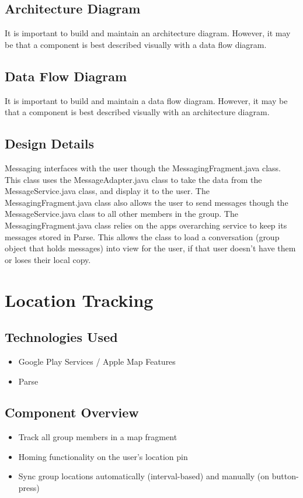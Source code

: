 \subsection{Architecture Diagram}
It is important to build and maintain an architecture diagram.  However, it may 
be that a component is best described visually with a data flow diagram. 

\subsection{Data Flow Diagram}
It is important to build and maintain a data flow diagram.  However, it may be 
that a component is best described visually with an architecture diagram. 

\subsection{Design Details}
Messaging interfaces with the user though the MessagingFragment.java class. This class uses the MessageAdapter.java class to take the data from the MessageService.java class, and display it to the user. The MessagingFragment.java class also allows the user to send messages though the MessageService.java class to all other members in the group.
The MessagingFragment.java class relies on the apps overarching service to keep its messages stored in Parse. This allows the class to load a conversation (group object that holds messages) into view for the user, if that user doesn't have them or loses their local copy.

\section{Location Tracking }

\subsection{Technologies  Used}
\begin{itemize}
  \item Google Play Services / Apple Map Features
  \item Parse
\end{itemize}

\subsection{Component  Overview}
\begin{itemize}
  \item Track all group members in a map fragment
  \item Homing functionality on the user's location pin
  \item Sync group locations automatically (interval-based) and manually (on button-press)
\end{itemize}

